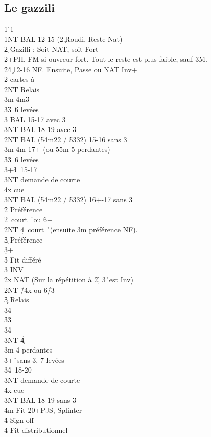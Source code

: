 \documentclass[a4paper]{article}
\begin{document}
\subsection{Le gazzili}

\begin{bidtable}
1\h-1\s--\\
1NT \> BAL 12-15 (2\c\ Roudi, Reste Nat)\\
2\c \> Gazilli : Soit NAT, soit Fort\+\\
2\d {}+PH, FM si ouvreur fort. Tout le reste est plus faible, sauf 3M.\+\\
2\h {}\h 4\c\ 12-16 NF. Ensuite, Passe ou NAT Inv+\\
2\s {} cartes à \s \+\\
2NT \> Relais\+\\
3m \h 4m3\s \\
3\h {}\h 3\s\ 6 levées\\
3\s \> BAL 15-17 avec 3\s \\
3NT \> BAL 18-19 avec 3\s \-\-\\
2NT \> BAL (54m22 / 5332) 15-16 sans 3\s \\
3m \h 4m 17+ (ou 5\h 5m 5 perdantes)\\
3\h {}\h 3\s\ 6 levées\\
3\s {}+\h 4\s\ 15-17\+\\
3NT \> demande de courte\\
4x \> cue\-\\
3NT \> BAL (54m22 / 5332) 16+-17 sans 3\s \-\\
2\h \> Préférence\\
2\s {}\s\ court \h\ ou 6+\s \\
2NT \d 4\s\ court \h\ (ensuite 3m préférence NF).\\
3\c \> Préférence\\
3\d {}+\d \\
3\h \> Fit différé\\
3\s \> INV\-\\
2x \> NAT (Sur la répétition à 2\h , 3\h\ est Inv)\\
2NT \h /4x ou 6\h /3\s \+\\
3\c \> Relais\+\\
3\d {}\h 4\d \\
3\h {}\h 3\s \\
3\s {}\h 4\s \\
3NT \h 4\c \-\-\\
3m  4 perdantes\\
3\h {}+\h\ sans 3\s , 7 levées\\
3\s {}\h 4\s\ 18-20\+\\
3NT \> demande de courte\\
4x \> cue\-\\
3NT \> BAL 18-19 sans 3\s \\
4m \> Fit 20+PJS, Splinter\\
4\h \> Sign-off\\
4\s \> Fit distributionnel
\end{bidtable}
\end{document}
